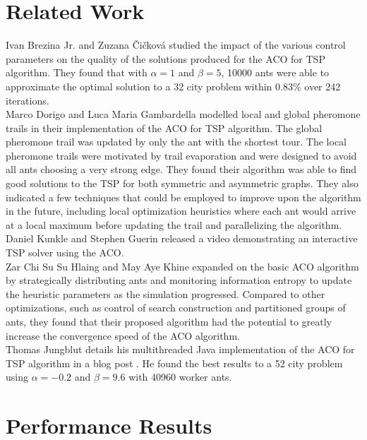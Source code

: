 \documentclass[twocolumn]{article}
\begin{document}
\section{Related Work}

Ivan Brezina Jr. and Zuzana \v{C}i\v{c}kov\'{a} \cite{mis:aco} studied the 
impact of the various control parameters on the quality of the solutions 
produced for the ACO for TSP algorithm. They found that with $\alpha=1$ and 
$\beta=5$, 10000 ants were able to approximate the optimal solution to a 32 city
problem within 0.83\% over 242 iterations. \\

Marco Dorigo and Luca Maria Gambardella \cite{iridia:aco} modelled local and 
global pheromone trails in their implementation of the ACO for TSP algorithm. 
The global pheromone trail was updated by only the ant with the shortest tour. 
The local pheromone trails were motivated by trail evaporation and were designed
to avoid all ants choosing a very strong edge. They found their algorithm was 
able to find good solutions to the TSP for both symmetric and asymmetric graphs.
They also indicated a few techniques that could be employed to improve upon the 
algorithm in the future, including local optimization heuristics where each ant 
would arrive at a local maximum before updating the trail and parallelizing the
algorithm. \\

Daniel Kunkle and Stephen Guerin released a video \cite{youtube:aco}
demonstrating an interactive TSP solver using the ACO. \\

Zar Chi Su Su Hlaing and May Aye Khine \cite{ipcsit:aco} expanded on the basic 
ACO algorithm by strategically distributing ants and monitoring information 
entropy to update the heuristic parameters as the simulation progressed. 
Compared to other optimizations, such as control of search construction and 
partitioned groups of ants, they found that their proposed algorithm had the 
potential to greatly increase the convergence speed of the ACO algorithm. \\

Thomas Jungblut details his multithreaded Java implementation of the ACO for TSP
algorithm in a blog post \cite{jungblut:aco}. He found the best results to a 52
city problem using $\alpha=-0.2$ and $\beta=9.6$ with 40960 worker ants.



\section{Performance Results}
\end{document}
